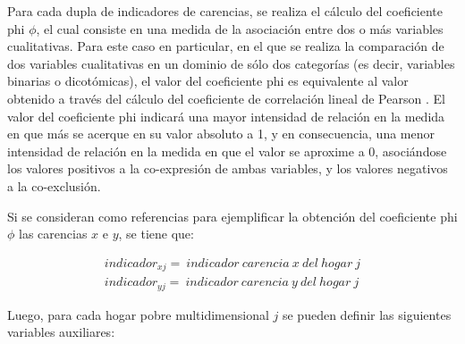 \documentclass[12pt,letterpaper,spanish]{article}
\begin{document}
\begin{enumerate}
Para cada dupla de indicadores de carencias, se realiza el cálculo del coeficiente phi $\phi$, el cual consiste en una medida de la asociación entre dos o más variables cualitativas. Para este caso en particular, en el que se realiza la comparación de dos variables cualitativas en un dominio de sólo dos categorías (es decir, variables binarias o dicotómicas), el valor del coeficiente phi es equivalente al valor obtenido a través del cálculo del coeficiente de correlación lineal de Pearson \cite{Chedzoy2014Phi-Coefficient}\cite{Chedzoy2006EncyclopediaPhi-coefficient}. El valor del coeficiente phi indicará una mayor intensidad de relación en la medida en que más se acerque en su valor absoluto a 1, y en consecuencia, una menor intensidad de relación en la medida en que el valor se aproxime a 0, asociándose los valores positivos a la co-expresión de ambas variables, y los valores negativos a la co-exclusión.\vspace{1.5em}

Si se consideran como referencias para ejemplificar la obtención del coeficiente phi $\phi$ las carencias $x$ e $y$, se tiene que:

\begin{equation}
\begin{split}
indicador_{xj}=\:indicador\:carencia\:x\:del\:hogar\:j\\
indicador_{yj}=\:indicador\:carencia\:y\:del\:hogar\:j
\end{split}
\end{equation}

Luego, para cada hogar pobre multidimensional $j$ se pueden definir las siguientes variables auxiliares:


\end{enumerate}
\end{document}
